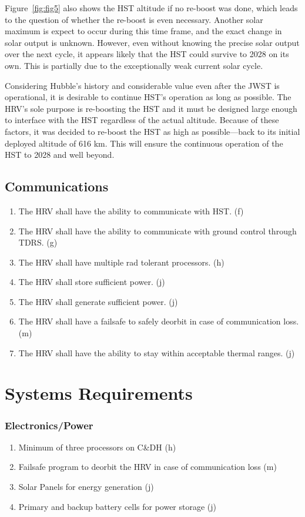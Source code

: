 \documentclass[onecolumn,10pt]{jhwhw}
\begin{document}
Figure~\ref{fig:fig5} also shows the HST altitude if no re-boost was done, which leads to the question of whether the re-boost is even necessary. Another solar maximum is expect to occur during this time frame, and the exact change in solar output is unknown. However, even without knowing the precise solar output over the next cycle, it appears likely that the HST could survive to 2028 on its own. This is partially due to the exceptionally weak current solar cycle.

Considering Hubble's history and considerable value even after the JWST is operational, it is desirable to continue HST's operation as long as possible. The HRV's sole purpose is re-boosting the HST and it must be designed large enough to interface with the HST regardless of the actual altitude. Because of these factors, it was decided to re-boost the HST as high as possible---back to its initial deployed altitude of 616 km. This will ensure the continuous operation of the HST to 2028 and well beyond.



\subsection{Communications}
\begin{enumerate}
\item The HRV shall have the ability to communicate with HST. (f)
\item The HRV shall have the ability to communicate with ground control through TDRS. (g)
\item The HRV shall have multiple rad tolerant processors. (h)
\item The HRV shall store sufficient power. (j)
\item The HRV shall generate sufficient power. (j)
\item The HRV shall have a failsafe to safely deorbit in case of communication loss. (m)
\item The HRV shall have the ability to stay within acceptable thermal ranges. (j)
\end{enumerate}

\section{Systems Requirements}
\subsubsection{Electronics/Power}
\begin{enumerate}
\item Minimum of three processors on C\&DH (h)
\item Failsafe program to deorbit the HRV in case of communication loss (m)
\item Solar Panels for energy generation (j)
\item Primary and backup battery cells for power storage (j)
\end{enumerate}
\end{document}
